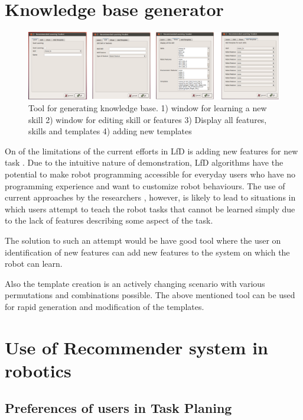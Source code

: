 \section{Knowledge base generator}
\begin{figure}[htp]
\centering
\includegraphics[scale=0.5]{images/tool/tool.png}
\caption[Tool for generating knowledge base]{Tool for generating knowledge base. 1) window for learning a new skill
2) window for editing skill or features 3) Display all features, skills and
templates 4) adding new templates}
\label{}
\end{figure}

On of the limitations of the current efforts in LfD is adding new features for
new task \cite {argall_survey_2009}. Due to the intuitive nature of
demonstration, LfD algorithms have the potential to make robot programming
accessible for everyday users who have no programming experience and want to
customize robot behaviours. The use of current approaches by the researchers
, however, is likely to lead to situations in which users attempt to
teach the robot tasks that cannot be learned simply due to the lack of features
describing some aspect of the task.

The solution to such an attempt would be have good tool where the user on 
identification of new features can add new features to the system on which 
the robot can learn.

Also the template creation is an actively changing scenario with various permutations
and combinations possible. The above mentioned tool can be used for rapid 
generation and modification of the templates.



\section{Use of Recommender system in robotics}
\subsection{Preferences of users in Task Planing}
